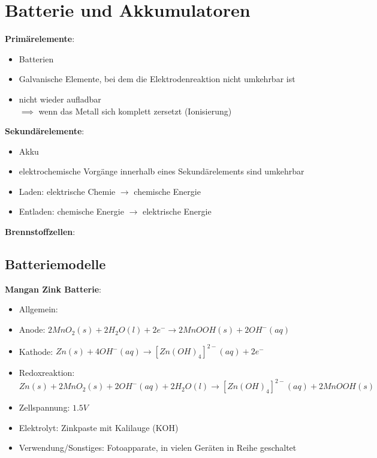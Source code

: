 \section{Batterie und Akkumulatoren}


\textbf{Primärelemente}: 
\begin{itemize}
    \item Batterien
    \item Galvanische Elemente, bei dem die Elektrodenreaktion nicht umkehrbar
        ist 
    \item nicht wieder aufladbar \\
        $\implies$ wenn das Metall sich komplett zersetzt (Ionisierung)
\end{itemize}

\vspace{1cm}

\textbf{Sekundärelemente}: 
\begin{itemize}
    \item Akku
    \item elektrochemische Vorgänge innerhalb eines Sekundärelements sind umkehrbar
    \item Laden: elektrische Chemie $\rightarrow$ chemische Energie
    \item Entladen: chemische Energie $\rightarrow$ elektrische Energie
\end{itemize}

\vspace{1cm}

\textbf{Brennstoffzellen}:


\subsection{Batteriemodelle}

\textbf{Mangan Zink Batterie}:
\begin{itemize}
    \item Allgemein: 
    \item Anode: $2MnO_2(s) + 2H_2O(l) + 2e^- \rightarrow 2MnOOH(s) + 2OH^-(aq)$
    \item Kathode: $Zn(s) + 4OH^-(aq) \rightarrow [Zn(OH)_4]^{2-}(aq) + 2e^-$
    \item Redoxreaktion: $Zn(s) + 2MnO_2(s) + 2OH^-(aq) + 2H_2O(l) \rightarrow
        [Zn(OH)_4]^{2-}(aq) + 2MnOOH(s)$
    \item Zellspannung: $1.5V$
    \item Elektrolyt: Zinkpaste mit Kalilauge (KOH)
    \item Verwendung/Sonstiges: Fotoapparate, in vielen Geräten in Reihe
        geschaltet
\end{itemize}

